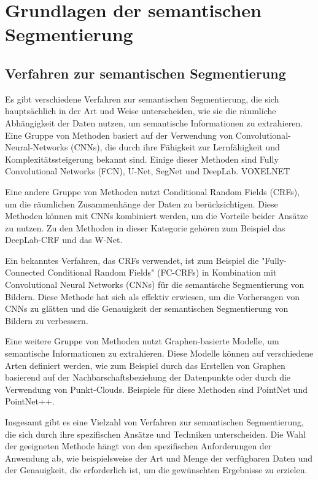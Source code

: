 \chapter{Grundlagen der semantischen Segmentierung}

\section{Verfahren zur semantischen Segmentierung}
Es gibt verschiedene Verfahren zur semantischen Segmentierung, die sich
hauptsächlich in der Art und Weise unterscheiden, wie sie die räumliche
Abhängigkeit der Daten nutzen, um semantische Informationen zu extrahieren.
Eine Gruppe von Methoden basiert auf der Verwendung von
Convolutional-Neural-Networks (CNNs), die durch ihre Fähigkeit zur
Lernfähigkeit und Komplexitätssteigerung bekannt sind. Einige dieser Methoden
sind Fully Convolutional Networks (FCN), U-Net, SegNet und DeepLab.  VOXELNET

Eine andere Gruppe von Methoden nutzt Conditional Random Fields (CRFs), um die
räumlichen Zusammenhänge der Daten zu berücksichtigen. Diese Methoden können
mit CNNs kombiniert werden, um die Vorteile beider Ansätze zu nutzen. Zu den
Methoden in dieser Kategorie gehören zum Beispiel das DeepLab-CRF und das
W-Net.

Ein bekanntes Verfahren, das CRFs verwendet, ist zum Beispiel die
"Fully-Connected Conditional Random Fields" (FC-CRFs) in Kombination mit
Convolutional Neural Networks (CNNs) für die semantische Segmentierung von
Bildern. Diese Methode hat sich als effektiv erwiesen, um die Vorhersagen von
CNNs zu glätten und die Genauigkeit der semantischen Segmentierung von Bildern
zu verbessern.

Eine weitere Gruppe von Methoden nutzt Graphen-basierte Modelle, um semantische
Informationen zu extrahieren. Diese Modelle können auf verschiedene Arten
definiert werden, wie zum Beispiel durch das Erstellen von Graphen basierend
auf der Nachbarschaftsbeziehung der Datenpunkte oder durch die Verwendung von
Punkt-Clouds. Beispiele für diese Methoden sind PointNet und PointNet++.

Insgesamt gibt es eine Vielzahl von Verfahren zur semantischen Segmentierung,
die sich durch ihre spezifischen Ansätze und Techniken unterscheiden. Die Wahl
der geeigneten Methode hängt von den spezifischen Anforderungen der Anwendung
ab, wie beispielsweise der Art und Menge der verfügbaren Daten und der
Genauigkeit, die erforderlich ist, um die gewünschten Ergebnisse zu erzielen.


